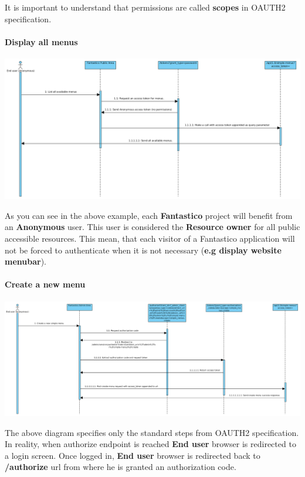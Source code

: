 \documentclass[letterpaper,10pt,english]{sphinxmanual}
\begin{document}
It is important to understand that permissions are called \textbf{scopes} in OAUTH2 specification.


\paragraph{Display all menus}
\label{features/oauth2/simple_api_example:display-all-menus}
\includegraphics{simple_menu_read.png}

As you can see in the above example, each \textbf{Fantastico} project will benefit from an \textbf{Anonymous} user. This user is considered
the \textbf{Resource owner} for all public accessible resources. This mean, that each visitor of a Fantastico application will not
be forced to authenticate when it is not necessary (\textbf{e.g display website menubar}).


\paragraph{Create a new menu}
\label{features/oauth2/simple_api_example:create-a-new-menu}\label{features/oauth2/simple_api_example:oauth-create-new-menu}
\includegraphics{simple_menu_create.png}

The above diagram specifies only the standard steps from OAUTH2 specification. In reality, when authorize endpoint is reached
\textbf{End user} browser is redirected to a login screen. Once logged in, \textbf{End user} browser is redirected back to \textbf{/authorize}
url from where he is granted an authorization code.
\end{document}
